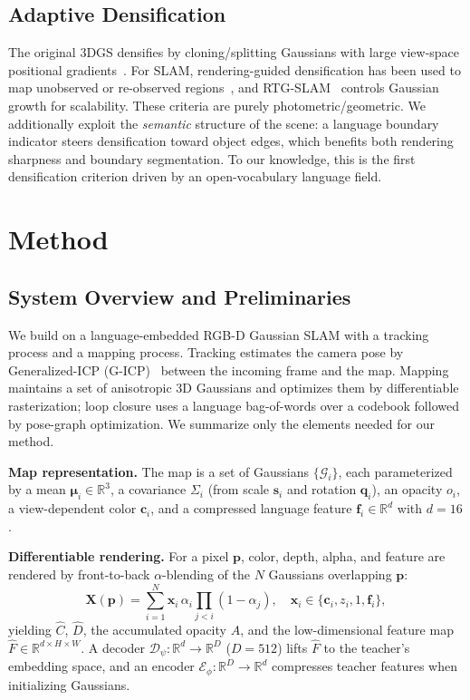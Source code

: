 \documentclass[10pt, journal]{IEEEtran}
\newcommand{\R}{\mathbb{R}}
\begin{document}
\subsection{Adaptive Densification}
The original 3DGS densifies by cloning/splitting Gaussians with large
view-space positional gradients~\cite{kerbl3Dgaussians}. For SLAM,
rendering-guided densification has been used to map unobserved or re-observed
regions~\cite{wu2024highfidelity}, and RTG-SLAM~\cite{peng2024rtgslam} controls
Gaussian growth for scalability. These criteria are purely photometric/geometric.
We additionally exploit the \emph{semantic} structure of the scene: a language
boundary indicator steers densification toward object edges, which benefits both
rendering sharpness and boundary segmentation. To our knowledge, this is the first
densification criterion driven by an open-vocabulary language field.

\section{Method}\label{sec:method}

\subsection{System Overview and Preliminaries}\label{sec:prelim}
We build on a language-embedded RGB-D Gaussian SLAM with a tracking process and a
mapping process. Tracking estimates the camera pose by Generalized-ICP
(G-ICP)~\cite{segal2009gicp} between the incoming frame and the map. Mapping
maintains a set of anisotropic 3D Gaussians and optimizes them by differentiable
rasterization; loop closure uses a language bag-of-words over a codebook followed
by pose-graph optimization. We summarize only the elements needed for our method.

\textbf{Map representation.} The map is a set of Gaussians
$\{\mathcal{G}_i\}$, each parameterized by a mean $\boldsymbol{\mu}_i\!\in\!\R^3$,
a covariance $\Sigma_i$ (from scale $\mathbf{s}_i$ and rotation $\mathbf{q}_i$), an
opacity $o_i$, a view-dependent color $\mathbf{c}_i$, and a compressed language
feature $\mathbf{f}_i\!\in\!\R^{d}$ with $d\!=\!16$.

\textbf{Differentiable rendering.} For a pixel $\mathbf{p}$, color, depth, alpha,
and feature are rendered by front-to-back $\alpha$-blending of the $N$ Gaussians
overlapping $\mathbf{p}$:
\begin{equation}
\mathbf{X}(\mathbf{p}) = \sum_{i=1}^{N} \mathbf{x}_i\, \alpha_i \!\!\prod_{j<i}(1-\alpha_j),
\quad \mathbf{x}_i \in \{\mathbf{c}_i, z_i, 1, \mathbf{f}_i\},
\label{eq:render}
\end{equation}
yielding $\hat{C}$, $\hat{D}$, the accumulated opacity $A$, and the low-dimensional
feature map $\hat{F}\!\in\!\R^{d\times H\times W}$. A decoder
$\mathcal{D}_\psi\!:\!\R^{d}\!\to\!\R^{D}$ ($D\!=\!512$) lifts $\hat{F}$ to the
teacher's embedding space, and an encoder $\mathcal{E}_\phi\!:\!\R^{D}\!\to\!\R^{d}$
compresses teacher features when initializing Gaussians.
\end{document}
